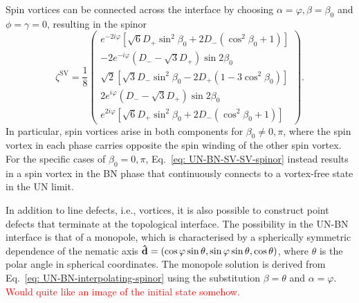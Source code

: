 Spin vortices can be connected across the interface by choosing
\(\alpha=\varphi, \beta=\beta_0 \) and \(\phi = \gamma = 0\), resulting in the
spinor
\begin{equation}\label{eq: UN-BN-SV-SV-spinor}
    \zeta^\mathrm{SV} =
    \frac{1}{8}\begin{pmatrix}
        e^{-2i\varphi}\left[\sqrt{6} D_+ \sin ^2\beta _0
        + 2D_- \left(\cos^2\beta _0+1\right)\right]                   \\
        -2e^{-i\varphi} \left(D_--\sqrt{3} D_+\right) \sin 2 \beta _0 \\
        \sqrt{2}\left[ \sqrt{3} D_- \sin ^2\beta _0
        - 2D_+ \left(1-3 \cos^2 \beta _0\right)\right]                \\
        2 e^{i\varphi}\left(D_--\sqrt{3} D_+\right) \sin 2 \beta _0   \\
        e^{2i\varphi}\left[\sqrt{6} D_+ \sin ^2\beta _0
            + 2D_- \left(\cos^2\beta _0+1\right)\right]
    \end{pmatrix}.
\end{equation}
In particular, spin vortices arise in both components for
\(\beta_0 \neq 0, \pi \), where the spin vortex in each phase carries opposite
the spin winding of the other spin vortex.
For the specific cases of \(\beta_0 = 0, \pi \),
Eq.~\eqref{eq: UN-BN-SV-SV-spinor} instead results in a spin vortex in the BN
phase that continuously connects to a vortex-free state in the UN limit.

In addition to line defects, i.e., vortices, it is also possible to construct
point defects that terminate at the topological interface.
The possibility in the UN-BN interface is that of a monopole, which is
characterised by a spherically symmetric dependence of the nematic axis
\(\vb{\hat{d}} = (\cos\varphi \sin\theta, \sin\varphi \sin\theta, \cos\theta)\),
where \(\theta \) is the polar angle in spherical coordinates.
The monopole solution is derived from Eq.~\eqref{eq: UN-BN-interpolating-spinor}
using the substitution \(\beta = \theta \) and \(\alpha=\varphi \).
\textcolor{red}{Would quite like an image of the initial state somehow.}


